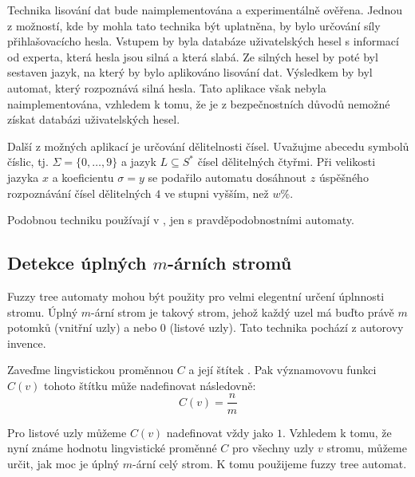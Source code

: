 \documentclass[a4paper,10pt]{article}
\begin{document}
Technika lisování dat bude naimplementována a experimentálně ověřena.  Jednou z možností, kde by mohla tato technika být uplatněna, by bylo určování síly přihlašovacícho hesla. Vstupem by byla databáze uživatelských hesel s informací od experta, která hesla jsou silná a která slabá. Ze silných hesel by poté byl sestaven jazyk, na který by bylo aplikováno lisování dat. Výsledkem by byl automat, který rozpoznává silná hesla. Tato aplikace však nebyla naimplementována, vzhledem k tomu, že je z bezpečnostních důvodů nemožné získat databázi uživatelských hesel.

Další z možných aplikací je určování dělitelnosti čísel. Uvažujme abecedu symbolů číslic, tj. $\Sigma = \{ 0, \dots, 9 \}$ a jazyk $L \subseteq S^*$ čísel dělitelných čtyřmi. Při velikosti jazyka $x$ a koeficientu $\sigma = y$ se podařilo automatu dosáhnout $z$ úspěšného rozpoznávání čísel dělitelných $4$ ve stupni vyšším, než $w\%$. 

Podobnou techniku používají v \cite{Hac+-ProAnaLarFinStaMac}, jen s pravděpodobnostními automaty.


\subsection{Detekce úplných $m$-árních stromů}
Fuzzy tree automaty mohou být použity pro velmi elegentní určení úplnnosti stromu. Úplný $m$-ární strom je takový strom, jehož každý uzel má buďto právě $m$ potomků (vnitřní uzly) a nebo $0$ (listové uzly). Tato technika pochází z autorovy invence.

Zaveďme lingvistickou proměnnou $C$  a její štítek . Pak významovovu funkci $C(v)$  tohoto štítku může nadefinovat následovně:
$$
  C(v) = \frac{n}{m}
$$

Pro listové uzly můžeme $C(v)$ nadefinovat vždy jako $1$. Vzhledem k tomu, že nyní známe hodnotu lingvistické proměnné $C$ pro všechny uzly $v$ stromu, můžeme určit, jak moc je úplný $m$-ární celý strom. K tomu použijeme fuzzy tree automat.
% 
% 
\end{document}
